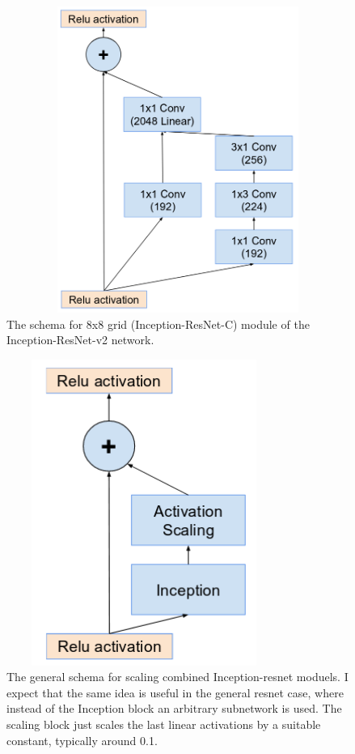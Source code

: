 \documentclass[a4paper,12pt, twoside]{NITKReport}
\begin{document}
\begin{figure}[h]
  \centering
    
    \includegraphics[height=10cm,width=13cm]{figure19.png}
    \caption{The schema for 8x8 grid (Inception-ResNet-C) module of the Inception-ResNet-v2 network.}
    \label{19}
  
  \end{figure}
\begin{figure}
\centering
    \includegraphics[height=10cm,width=9cm]{figure20.png}
    \caption{The general schema for scaling combined Inception-resnet moduels. I expect that the same idea is useful in the general resnet case, where instead of the Inception block an arbitrary subnetwork is used.  The scaling block just scales the last linear activations by a suitable constant, typically around 0.1.}
    \label{20}
\end{figure}
\end{document}

